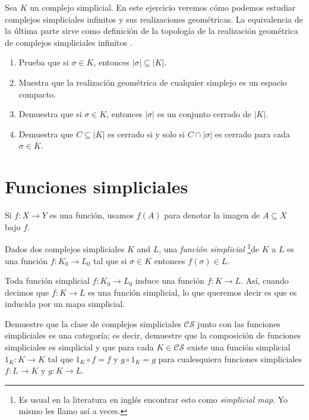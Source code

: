\documentclass{standalone}
\begin{document}
	\begin{exercise}\label{ex:geom_realization_colimit}
		Sea $K$ un complejo simplicial. En este ejercicio veremos cómo podemos estudiar complejos simpliciales infinitos y sus realizaciones geométricas. La equivalencia de la última parte sirve como definición de la topología de la realización geométrica de complejos simpliciales infinitos \cite[p. 8]{munkres:1984:algebraic:topology}.
		\begin{enumerate}
			\item Prueba que si $\sigma\in K$, entonces $|\sigma|\subseteq |K|$.
			\item Muestra que la realización geométrica de cualquier simplejo es un espacio compacto.
			\item Demuestra que si $\sigma\in K$, entonces $|\sigma|$ es un conjunto cerrado de $|K|$.
			\item Demuestra que $C\subseteq|K|$ es cerrado si y solo si $C\cap|\sigma|$ es cerrado para cada $\sigma\in K$.
		\end{enumerate}
	\end{exercise}
	
	\section{Funciones simpliciales}
	\noindent Si $f\colon X\rightarrow Y$ es una función, usamos $f(A)$ para denotar la imagen de $A\subseteq X$ bajo $f$.
	\begin{definition}\label{def:simplicial_map}
		Dados dos complejos simpliciales $K$ and $L$, una \emph{función simplicial} \footnote{Es usual en la literatura en inglés encontrar esto como \emph{simplicial map}. Yo mismo les llamo así a veces.}de $K$ a $L$ es una función $f\colon K_{0}\rightarrow L_{0}$ tal que si $\sigma\in K$ entonces $f(\sigma)\in L$.
	\end{definition}
	\begin{remark}
		Toda función simplicial $f\colon K_{0}\rightarrow L_{0}$ induce una función $f\colon K\rightarrow L$. Así, cuando decimos que $f\colon K\rightarrow L$ es una función simplicial, lo que queremos decir es que es inducida por un mapa simplicial. 
	\end{remark}
	
	\begin{exercise}
		Demuestre que la clase de complejos simpliciales $\mathcal{CS}$ junto con las funciones simpliciales es una categoría; es decir, demuestre que la composición de funciones simpliciales es simplicial y que para cada $K\in\mathcal{CS}$ existe una función simplicial $1_{K} \colon K\rightarrow K$ tal que $1_{K}\circ f = f$ y $g\circ 1_{K} = g$ para cualesquiera funciones simpliciales $f\colon L\rightarrow K$ y $g\colon K\rightarrow L$.
	\end{exercise}
	
\end{document}
